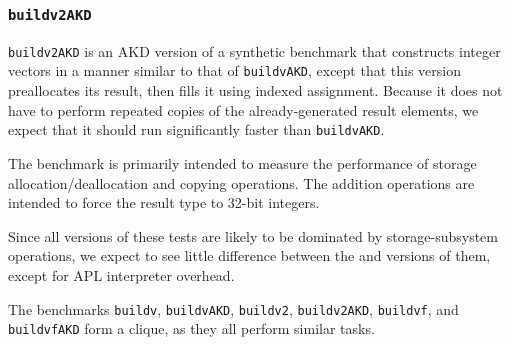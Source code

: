 \subsubsection{\tt buildv2AKD}
\label{benchmarkbuildv2akd}

{\tt buildv2AKD} is an AKD version of a synthetic benchmark 
that constructs integer
vectors in a manner similar to that of {\tt buildvAKD}, except that
this version preallocates its result, then fills it using indexed
assignment. Because it does not have to perform repeated copies
of the already-generated result elements, we expect that it should
run significantly faster than {\tt buildvAKD}.

The benchmark is primarily intended to measure the
performance of storage allocation/deallocation and
copying operations. The addition operations are
intended to force the result type to 32-bit integers.

Since all versions of these tests are likely to be dominated
by storage-subsystem operations, we expect to see little
difference between the \dapl and \sac versions of them,
except for APL interpreter overhead.

The benchmarks {\tt buildv}, {\tt buildvAKD}, {\tt buildv2}, {\tt buildv2AKD},
{\tt buildvf}, and {\tt buildvfAKD} form a clique, as they
all perform similar tasks.

